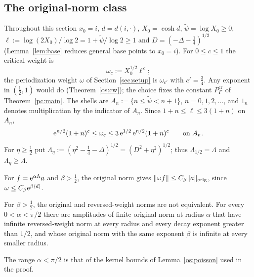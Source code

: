 \subsection{The original-norm class}\label{subsec:pc-weights}
Throughout this section $x_0=i$, $d=d(i,\cdot)$, $X_0=\cosh d$, $\tilde\psi=\log X_0\ge0$, $\ell:=\log(2X_0)/\log2=1+\tilde\psi/\log2\ge1$
and $D=(-\Delta-\tfrac14)^{1/2}$ (Lemma~\ref{lem:base} reduces general base points to $x_0=i$). For $0\le c\le1$ the critical weight is
\[
\omega_c:=X_0^{1/2}\ell^{\,c};
\]
the periodization weight $\omega$ of Section~\ref{sec:setup} is $\omega_{c'}$ with $c'=\tfrac34$. Any exponent in $(\tfrac12,1)$ would do (Theorem~\ref{os:cw});
the choice fixes the constant $P^{\mathrm{cr}}_\Gamma$ of Theorem~\ref{pc:main}. The shells are $A_n:=\{n\le\tilde\psi<n+1\}$, $n=0,1,2,\dots$, and
$1_n$ denotes multiplication by the indicator of $A_n$. Since $1+n\le\ell\le3(1+n)$ on $A_n$,
\begin{equation}\label{os:shell}
\mathrm{e}^{n/2}(1+n)^c\le\omega_c\le3\,\mathrm{e}^{1/2}\,\mathrm{e}^{n/2}(1+n)^c\qquad\text{on }A_n .
\end{equation}
For $\eta\ge\tfrac12$ put $\Lambda_\eta:=(\eta^2-\tfrac14-\Delta)^{1/2}=(D^2+\eta^2)^{1/2}$; thus $\Lambda_{1/2}=\Lambda$ and $\Lambda_\eta\ge\Lambda$.



For $f=\mathrm{e}^{\alpha\Lambda}a$ and $\beta>\tfrac12$, the original norm gives $\|\omega f\|\le C_\beta\lVert a\rVert_{\mathrm{orig}}$, since
$\omega\le C_\beta\mathrm{e}^{\beta\langle d\rangle}$.

\begin{proposition}\label{pc:classes}
For $\beta>\tfrac12$, the original and reversed-weight norms are not equivalent. For every $0<\alpha<\pi/2$ there are amplitudes of finite original norm at radius $\alpha$ that have infinite reversed-weight norm at every radius and every decay exponent greater than $1/2$, and whose original norm with the same exponent $\beta$ is infinite at every smaller radius.
\end{proposition}

The range $\alpha<\pi/2$ is that of the kernel bounds of Lemma~\ref{os:poisson} used in the proof.

